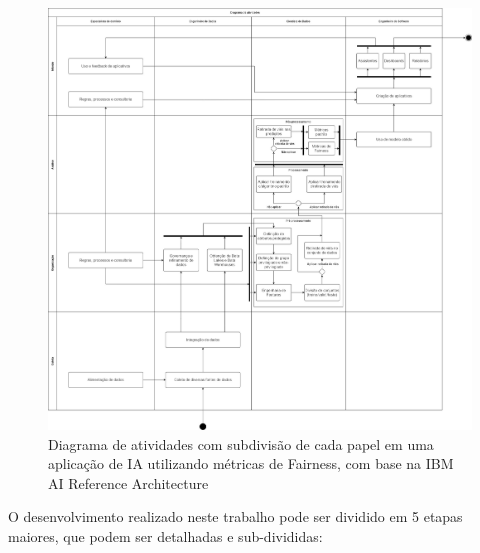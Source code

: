 \documentclass[portugues]{ic-tese}
\begin{document}
\begin{figure}[H]
\centering
\includegraphics[scale=0.25]{images/Diagrama_Atividades.jpg}
\caption {Diagrama de atividades com subdivisão de cada papel em uma aplicação de IA utilizando métricas de Fairness, com base na IBM AI Reference Architecture~\citep{IBM_2021}}
\label{fig:AIRoles}
\end{figure}

O desenvolvimento realizado neste trabalho pode ser dividido em 5 etapas maiores, que podem ser detalhadas e sub-divididas:
\end{document}
